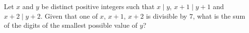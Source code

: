 Let $x$ and $y$ be distinct positive integers such that $x\mid y$, $x+1\mid y+1$ and $x+2\mid y+2$. Given that one of $x$, $x+1$, $x+2$ is divisible by $7$, what is the sum of the digits of the smallest possible value of $y$?
